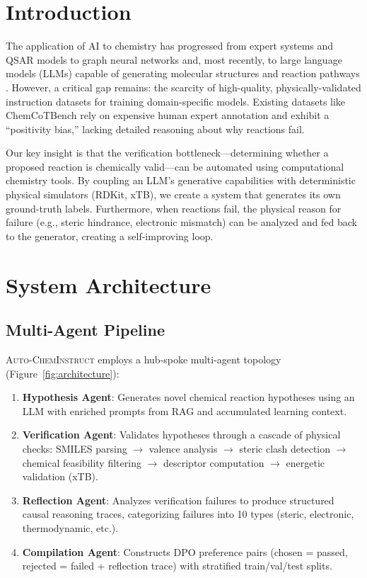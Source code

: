 \documentclass{article}
\begin{document}
\section{Introduction}

The application of AI to chemistry has progressed from expert systems and QSAR models to graph neural networks and, most recently, to large language models (LLMs) capable of generating molecular structures and reaction pathways \cite{}. However, a critical gap remains: the scarcity of high-quality, physically-validated instruction datasets for training domain-specific models. Existing datasets like ChemCoTBench \cite{} rely on expensive human expert annotation and exhibit a ``positivity bias,'' lacking detailed reasoning about why reactions fail.

Our key insight is that the verification bottleneck—determining whether a proposed reaction is chemically valid—can be automated using computational chemistry tools. By coupling an LLM's generative capabilities with deterministic physical simulators (RDKit, xTB), we create a system that generates its own ground-truth labels. Furthermore, when reactions fail, the physical reason for failure (e.g., steric hindrance, electronic mismatch) can be analyzed and fed back to the generator, creating a self-improving loop.

\section{System Architecture}

\subsection{Multi-Agent Pipeline}

\textsc{Auto-ChemInstruct} employs a hub-spoke multi-agent topology (Figure~\ref{fig:architecture}):

\begin{enumerate}
    \item \textbf{Hypothesis Agent}: Generates novel chemical reaction hypotheses using an LLM with enriched prompts from RAG and accumulated learning context.
    \item \textbf{Verification Agent}: Validates hypotheses through a cascade of physical checks: SMILES parsing $\rightarrow$ valence analysis $\rightarrow$ steric clash detection $\rightarrow$ chemical feasibility filtering $\rightarrow$ descriptor computation $\rightarrow$ energetic validation (xTB).
    \item \textbf{Reflection Agent}: Analyzes verification failures to produce structured causal reasoning traces, categorizing failures into 10 types (steric, electronic, thermodynamic, etc.).
    \item \textbf{Compilation Agent}: Constructs DPO preference pairs (chosen = passed, rejected = failed + reflection trace) with stratified train/val/test splits.
\end{enumerate}
\end{document}
